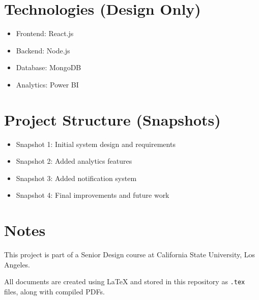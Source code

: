 \documentclass[12pt]{article}
\begin{document}
\section{Technologies (Design Only)}
\begin{itemize}
    \item Frontend: React.js
    \item Backend: Node.js
    \item Database: MongoDB
    \item Analytics: Power BI
\end{itemize}

\section{Project Structure (Snapshots)}
\begin{itemize}
    \item Snapshot 1: Initial system design and requirements
    \item Snapshot 2: Added analytics features
    \item Snapshot 3: Added notification system
    \item Snapshot 4: Final improvements and future work
\end{itemize}

\section{Notes}
This project is part of a Senior Design course at California State University, Los Angeles.

All documents are created using LaTeX and stored in this repository as \texttt{.tex} files, along with compiled PDFs.
\end{document}
